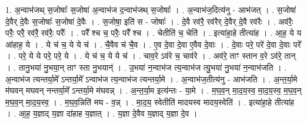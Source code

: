\documentclass[17pt]{extarticle}
\begin{document}
1. अ॒न्वाभ॑जथ् स॒जोषाः᳚ स॒जोषा॑ अ॒न्वाभ॑ज द॒न्वाभ॑जथ् स॒जोषाः᳚ । . अ॒न्वाभ॑ज॒दित्य॑नु - आभ॑जत् । . स॒जोषा॑ दे॒वैर् दे॒वैः स॒जोषाः᳚ स॒जोषा॑ दे॒वैः । . स॒जोषा॒ इति॑ स - जोषाः᳚ । . दे॒वै रव॑रै॒ रव॑रैर् दे॒वैर् दे॒वै रव॑रैः । . अव॑रैः॒ परैः॒ परै॒ रव॑रै॒ रव॑रैः॒ परैः᳚ । . परै᳚ श्च च॒ परैः॒ परै᳚ श्च । . चेतीति॑ च॒ चेति॑ । . इत्या॑हा॒हे तीत्या॑ह । . आ॒ह॒ ये य आ॑हाह॒ ये । . ये च॑ च॒ ये ये च॑ । . चै॒वैव च॑ चै॒व । . ए॒व दे॒वा दे॒वा ए॒वैव दे॒वाः । . दे॒वाः परे॒ परे॑ दे॒वा दे॒वाः परे᳚ । . परे॒ ये ये परे॒ परे॒ ये । . ये च॑ च॒ ये ये च॑ । . चाव॒रे ऽव॑रे च॒ चाव॑रे । . अव॑रे॒ ताꣳ स्तान व॒रे ऽव॑रे॒ तान् । . तानु॒भया॑ नु॒भया॒न् ताꣳ स्ता नु॒भयान्॑ । . उ॒भया॑ न॒न्वाभ॑ज त्य॒न्वाभ॑ज त्यु॒भया॑ नु॒भया॑ न॒न्वाभ॑जति । . अ॒न्वाभ॑ज त्यन्तर्या॒मे᳚ ऽन्तर्या॒मे᳚ ऽन्वाभ॑ज त्य॒न्वाभ॑ज त्यन्तर्या॒मे । . अ॒न्वाभ॑ज॒तीत्य॑नु - आभ॑जति । . अ॒न्त॒र्या॒मे म॑घवन् मघवन् नन्तर्या॒मे᳚ ऽन्तर्या॒मे म॑घवन्न् । . अ॒न्त॒र्या॒म इत्य॑न्तः - या॒मे । . म॒घ॒व॒न् मा॒द॒य॒स्व॒ मा॒द॒य॒स्व॒ म॒घ॒व॒न् म॒घ॒व॒न् मा॒द॒य॒स्व॒ । . म॒घ॒व॒न्निति॑ मघ - व॒न्न् । . मा॒द॒य॒ स्वेतीति॑ मादयस्व मादय॒स्वेति॑ । . इत्या॑हा॒हे तीत्या॑ह । . आ॒ह॒ य॒ज्ञाद् य॒ज्ञा दा॑हाह य॒ज्ञात् । . य॒ज्ञा दे॒वैव य॒ज्ञाद् य॒ज्ञा दे॒व । \newline
\end{document}

